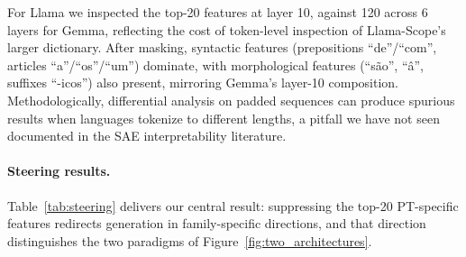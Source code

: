 \documentclass[runningheads]{llncs}
\begin{document}
\begin{table}[t]
\centering
\caption{Top-20 Llama-Scope PT features (layer 10) after padding masking. Features are categorized by their top-activating tokens on genuine (non-padding) Portuguese text.}
\label{tab:llama_features}
\footnotesize
{}
\end{table}

For Llama we inspected the top-20 features at layer 10, against 120 across 6 layers for Gemma, reflecting the cost of token-level inspection of Llama-Scope's larger dictionary. After masking, syntactic features (prepositions ``de''/``com'', articles ``a''/``os''/``um'') dominate, with morphological features (``s\~ao'', ``\^a'', suffixes ``-icos'') also present, mirroring Gemma's layer-10 composition. Methodologically, differential analysis on padded sequences can produce spurious results when languages tokenize to different lengths, a pitfall we have not seen documented in the SAE interpretability literature.

\paragraph{Steering results.}
\label{sec:steering}

Table~\ref{tab:steering} delivers our central result: suppressing the top-20 PT-specific features redirects generation in family-specific directions, and that direction distinguishes the two paradigms of Figure~\ref{fig:two_architectures}.
\end{document}
